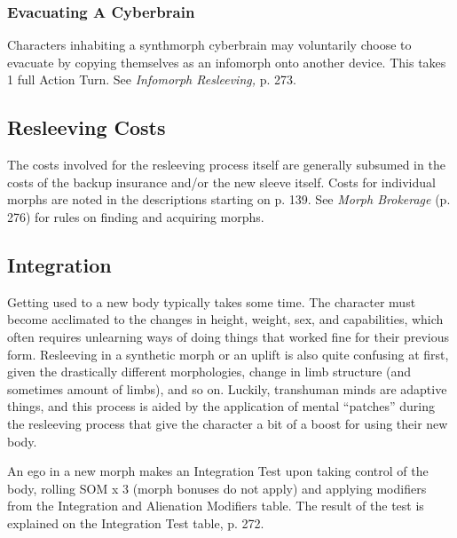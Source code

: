 \subsubsection{Evacuating A Cyberbrain}

Characters inhabiting a synthmorph cyberbrain may 
voluntarily choose to evacuate by copying themselves 
as an infomorph onto another device. This takes 1 full 
Action Turn. See \textit{Infomorph Resleeving,} p. 273.

\subsection{Resleeving Costs}

The costs involved for the resleeving process itself are 
generally subsumed in the costs of the backup insurance
and/or the new sleeve itself. Costs for individual
morphs are noted in the descriptions starting on p. 
139. See \textit{Morph Brokerage} (p. 276) for rules on finding
and acquiring morphs.

\subsection{Integration}

Getting used to a new body typically takes some time. 
The character must become acclimated to the changes 
in height, weight, sex, and capabilities, which often 
requires unlearning ways of doing things that worked 
fine for their previous form. Resleeving in a synthetic 
morph or an uplift is also quite confusing at first, 
given the drastically different morphologies, change in 
limb structure (and sometimes amount of limbs), and 
so on. Luckily, transhuman minds are adaptive things, 
and this process is aided by the application of mental 
``patches'' during the resleeving process that give the 
character a bit of a boost for using their new body.

An ego in a new morph makes an Integration Test 
upon taking control of the body, rolling SOM x 3 (morph 
bonuses do not apply) and applying modifiers from the 
Integration and Alienation Modifiers table. The result of 
the test is explained on the Integration Test table, p. 272.
\\


